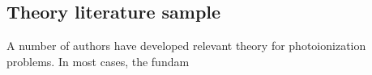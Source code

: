\subsection{Theory literature sample\label{sec:theory-lit}}

A number of authors have developed relevant theory for photoionization problems. In most cases, the fundam